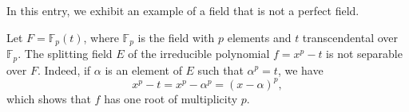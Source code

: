 \documentclass[12pt]{article}
\begin{document}
In this entry, we exhibit an example of a field that is not a perfect field.

Let $F = \mathbb{F}_p(t)$, where $\mathbb{F}_p$ is the field with $p$ elements and $t$ transcendental over $\mathbb{F}_p$. The splitting field $E$ of the irreducible polynomial $f = x^p - t$ is not separable over $F$. Indeed, if $\alpha$ is an element of $E$ such that $\alpha^p = t$, we have
\[ x^p - t = x^p - \alpha^p = (x-\alpha)^p, \]
which shows that $f$ has one root of multiplicity $p$.
\end{document}
